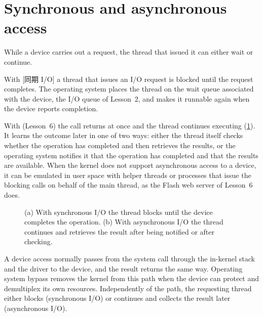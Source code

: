 \documentclass[../main.tex]{subfiles}
\begin{document}
\section{Synchronous and asynchronous access}
\label{sec:l11-sync}

While a device carries out a request, the thread that issued it can either wait or
continue.

\begin{definition}[Synchronous I/O]
  With [同期 I/O] a thread that issues an I/O request
  is blocked until the request completes.  The operating system places the
  thread on the wait queue associated with the device, the I/O queue of
  Lesson~2, and makes it runnable again when the device reports completion.
\end{definition}

With  (Lesson~6) the call
returns at once and the thread continues executing
(\cref{fig:l11-sync-async}).  It learns the outcome later in one of two
ways: either the thread itself checks whether the operation has completed
and then retrieves the results, or the operating system notifies it that
the operation has completed and that the results are available.  When the
kernel does not support asynchronous access to a device, it can be emulated
in user space with helper threads or processes that issue the blocking
calls on behalf of the main thread, as the Flash web server of Lesson~6
does.

\begin{figure}[htbp]
  \centering
  
  \caption{(a) With synchronous I/O the thread blocks until the device
    completes the operation.  (b) With asynchronous I/O the thread continues
    and retrieves the result after being notified or after checking.}
  \label{fig:l11-sync-async}
\end{figure}

\begin{keypoint}
  A device access normally passes from the system call through the
  in-kernel stack and the driver to the device, and the result returns the
  same way.  Operating system bypass removes the kernel from this path when
  the device can protect and demultiplex its own resources.  Independently
  of the path, the requesting thread either blocks (synchronous I/O) or
  continues and collects the result later (asynchronous I/O).
\end{keypoint}
\end{document}
